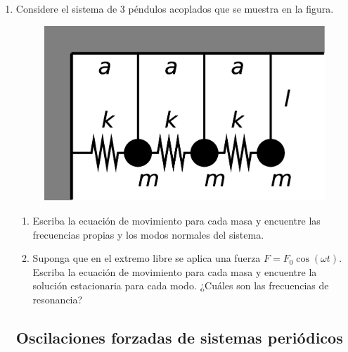 \documentclass[11pt,spanish,a4paper]{article}
\begin{document}
\begin{enumerate}
\item Considere el sistema de 3 péndulos acoplados que se muestra en la figura.
\begin{figure}[H]
	\centering{}\includegraphics[clip,scale=0.25]{ej1-14}
\end{figure}

\begin{enumerate}
	\item Escriba la ecuación de movimiento para cada masa y encuentre las frecuencias
	propias y los modos normales del sistema. 
	\item Suponga que en el extremo libre se aplica una fuerza $F= F_0 \cos(\omega t)$.
	Escriba la ecuación de movimiento para cada masa y encuentre la solución estacionaria para cada modo.
	¿Cuáles son las frecuencias de resonancia?
\end{enumerate}



\subsection*{Oscilaciones forzadas de sistemas periódicos}



\end{enumerate}
\end{document}

